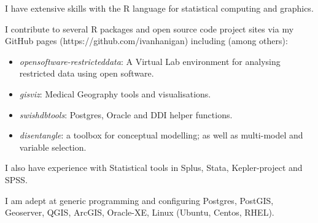 \documentclass[a4paper,11pt]{article}
\begin{document}
\medskip
\renewcommand{\labelenumi}{\textsc{j}\theenumi.}
\begin{revnumerate}

\item I have extensive skills with the R language for statistical computing and graphics.

\item I contribute to several R packages and open source code project sites via my GitHub pages (https://github.com/ivanhanigan) including (among others): 

\begin{itemize}
\item \emph{opensoftware-restricteddata}: A Virtual Lab environment for analysing restricted data using open software.
\item \emph{gisviz}: Medical Geography tools and visualisations.
\item \emph{swishdbtools}: Postgres, Oracle and DDI helper functions.
\item \emph{disentangle}: a toolbox for conceptual modelling; as well as multi-model and variable selection.
\end{itemize}

\item I also have experience with Statistical tools in Splus, Stata, Kepler-project and SPSS.

\item I am adept at generic programming and configuring Postgres, PostGIS, Geoserver, QGIS, ArcGIS,  Oracle-XE, Linux (Ubuntu, Centos, RHEL).
\end{revnumerate}
\end{document}
